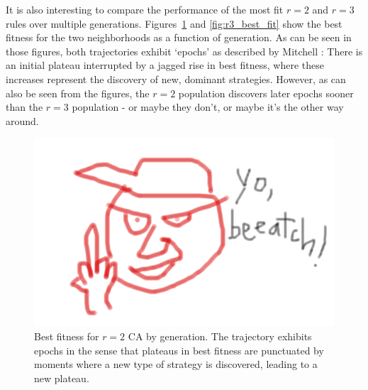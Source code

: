 It is also interesting to compare the performance of the most fit $r = 2$ and $r = 3$ rules over multiple generations. Figures~\ref{fig:r2_best_fit} and 
\ref{fig:r3_best_fit} show the best fitness for the two neighborhoods as a function of generation. As can be seen in those figures, both trajectories exhibit 
`epochs' as described by Mitchell \cite{Mitchell:1994:ECA:186092.186116}: There is an initial plateau interrupted by a jagged rise in best fitness, where 
these increases represent the discovery of new, dominant strategies. However, as can also be seen from the figures, the $r = 2$ population discovers later epochs sooner than the $r = 3$ population - or maybe they don't, or maybe it's the other way around.

\begin{figure}
\begin{center}
\includegraphics[width=\linewidth]{foo.png}
\caption{Best fitness for $r = 2$ CA by generation. The trajectory exhibits epochs in the sense that plateaus in best fitness are punctuated by moments 
where a new type of strategy is discovered, leading to a new plateau.}
\label{fig:r2_best_fit}
\end{center}
\end{figure}
